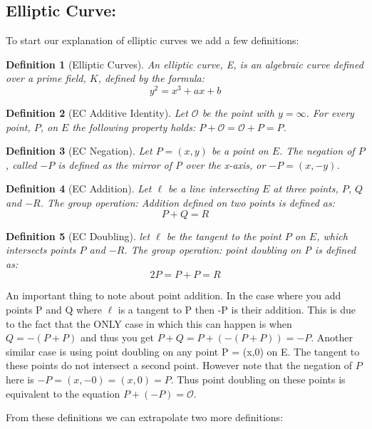 \documentclass{article}
\newtheorem{definition}{Definition}[section]
\begin{document}
\subsection{Elliptic Curve:}\label{elliptic-curves}

To start our explanation of elliptic curves we add a few definitions:

\begin{definition}[Elliptic Curves]
	An elliptic curve, E, is an algebraic curve defined over a prime field,
	$K$, defined by the formula:
	$$y^2 = x^3 + ax + b$$
\end{definition}

\begin{definition}[EC Additive Identity]
	Let $\mathcal{O}$ be the point with $y = \infty$. For every point, $P$,
	on $E$ the following property holds:
	$P + \mathcal{O} = \mathcal{O} + P = P$.
\end{definition}

\begin{definition}[EC Negation]
	Let $P = (x,y)$ be a point on $E$. The negation of $P$, called $-P$
	is defined as the mirror of P over the x-axis, or $-P = (x,-y)$.
\end{definition}

\begin{definition}[EC Addition]
	Let $\ell$ be a line intersecting $E$ at three points, $P$, $Q$ and
	$-R$. The group operation: Addition defined on two points is defined
	as:
	$$P + Q = R$$
\end{definition}

\begin{definition}[EC Doubling]
	let $\ell$ be the tangent to the point $P$ on $E$, which intersects
	points $P$ and $-R$. The group operation: point doubling on P is
	defined as:
	$$2P = P + P = R$$
\end{definition}

An important thing to note about point addition. In the case where you
add points P and Q where $\ell$ is a tangent to P then -P is their
addition. This is due to the fact that the ONLY case in which this can
happen is when $Q = -(P + P)$ and thus you get
$P + Q = P + (-(P + P)) = -P$. Another similar case is using point
doubling on any point P = (x,0) on E. The tangent to these points do not
intersect a second point. However note that the negation of $P$ here is
$-P = (x,-0) = (x,0) = P$. Thus point doubling on these points is
equivalent to the equation $P + (-P) = \mathcal{O}$.

From these definitions we can extrapolate two more definitions:
\end{document}
